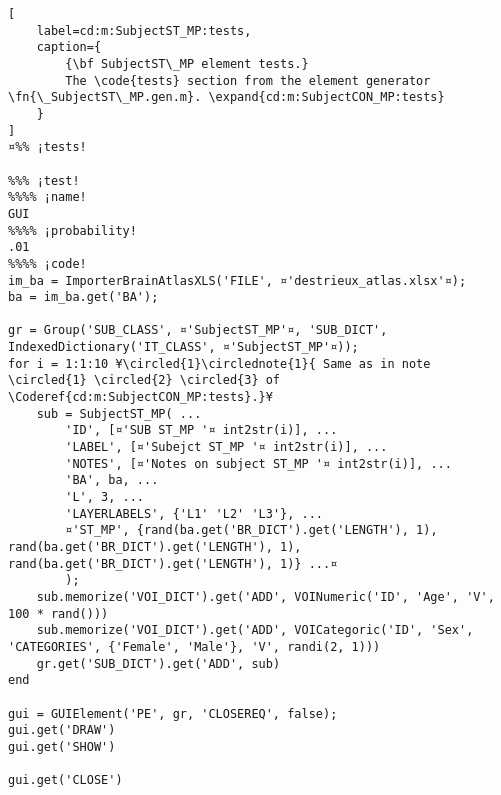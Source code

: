 \documentclass{tufte-handout}
\begin{document}
\begin{lstlisting}[
	label=cd:m:SubjectST_MP:tests,
	caption={
		{\bf SubjectST\_MP element tests.}
		The \code{tests} section from the element generator \fn{\_SubjectST\_MP.gen.m}. \expand{cd:m:SubjectCON_MP:tests}
	}
]
¤%% ¡tests!

%%% ¡test!
%%%% ¡name!
GUI
%%%% ¡probability!
.01
%%%% ¡code!
im_ba = ImporterBrainAtlasXLS('FILE', ¤'destrieux_atlas.xlsx'¤);
ba = im_ba.get('BA');

gr = Group('SUB_CLASS', ¤'SubjectST_MP'¤, 'SUB_DICT', IndexedDictionary('IT_CLASS', ¤'SubjectST_MP'¤));
for i = 1:1:10 ¥\circled{1}\circlednote{1}{ Same as in note \circled{1} \circled{2} \circled{3} of \Coderef{cd:m:SubjectCON_MP:tests}.}¥
    sub = SubjectST_MP( ...
        'ID', [¤'SUB ST_MP '¤ int2str(i)], ...
        'LABEL', [¤'Subejct ST_MP '¤ int2str(i)], ...
        'NOTES', [¤'Notes on subject ST_MP '¤ int2str(i)], ...
        'BA', ba, ...
        'L', 3, ...
        'LAYERLABELS', {'L1' 'L2' 'L3'}, ...
        ¤'ST_MP', {rand(ba.get('BR_DICT').get('LENGTH'), 1), rand(ba.get('BR_DICT').get('LENGTH'), 1), rand(ba.get('BR_DICT').get('LENGTH'), 1)} ...¤
        );
    sub.memorize('VOI_DICT').get('ADD', VOINumeric('ID', 'Age', 'V', 100 * rand()))
    sub.memorize('VOI_DICT').get('ADD', VOICategoric('ID', 'Sex', 'CATEGORIES', {'Female', 'Male'}, 'V', randi(2, 1)))
    gr.get('SUB_DICT').get('ADD', sub)
end

gui = GUIElement('PE', gr, 'CLOSEREQ', false);
gui.get('DRAW')
gui.get('SHOW')

gui.get('CLOSE')
\end{lstlisting}
\end{document}
